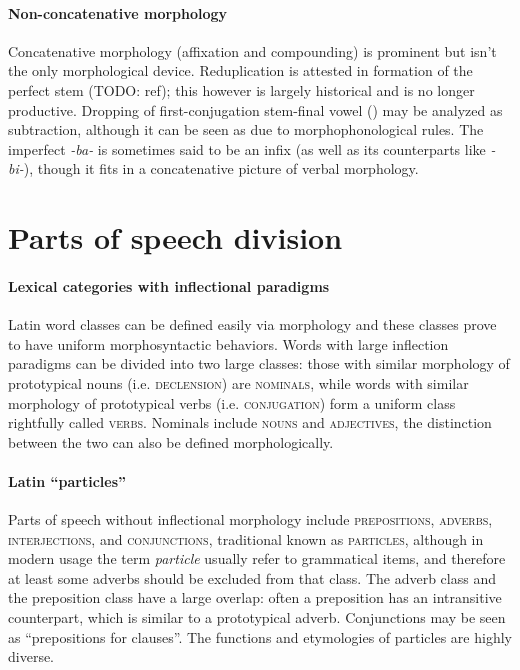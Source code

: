 \documentclass[a4paper, oneside, 12pt]{report}
\newcommand*{\term}[1]{\emph{#1}}
\newcommand{\form}[1]{\emph{#1}}
\newcommand*{\category}[1]{\textsc{#1}}
\begin{document}
\paragraph*{Non-concatenative morphology}

Concatenative morphology (affixation and compounding) 
is prominent but isn't the only morphological device.
Reduplication is attested in 
formation of the perfect stem (TODO: ref);
this however is largely historical 
and is no longer productive.
Dropping of first-conjugation stem-final vowel ()
may be analyzed as subtraction,
although it can be seen as due to morphophonological rules.
The imperfect \form{-ba-} is sometimes said to be an infix 
(as well as its counterparts like \form{-bi-}),
though it fits in a concatenative picture of verbal morphology.

\section{Parts of speech division}

\paragraph*{Lexical categories with inflectional paradigms}

Latin word classes can be defined easily via morphology
and these classes prove to have uniform morphosyntactic behaviors.
Words with large inflection paradigms can be divided into two large classes:
those with similar morphology of prototypical nouns (i.e. \category{declension}) are \category{nominals},
while words with similar morphology of prototypical verbs (i.e. \category{conjugation})
form a uniform class rightfully called \category{verbs}.
Nominals include \category{nouns} and \category{adjectives},
the distinction between the two can also be defined morphologically.

\paragraph*{Latin ``particles''}

Parts of speech without inflectional morphology include \category{prepositions}, \category{adverbs},
\category{interjections}, and \category{conjunctions},
traditional known as \category{particles}, 
although in modern usage the term \term{particle}
usually refer to grammatical items, 
and therefore at least some adverbs should be excluded from that class. 
The adverb class and the preposition class have a large overlap:
often a preposition has an intransitive counterpart,
which is similar to a prototypical adverb.
Conjunctions may be seen as ``prepositions for clauses''.
The functions and etymologies of particles are highly diverse.
\end{document}
